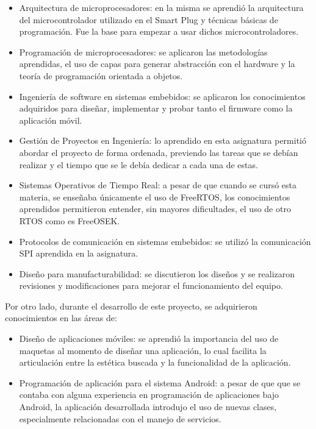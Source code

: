\begin{itemize}
\item Arquitectura de microprocesadores: en la misma se aprendió la arquitectura del microcontrolador utilizado en el Smart Plug y técnicas básicas de programación. Fue la base para empezar a usar dichos microcontroladores.
\item Programación de microprocesadores: se aplicaron las metodologías aprendidas, el uso de capas para generar abstracción con el hardware y la teoría de programación orientada a objetos.
\item Ingeniería de software en sistemas embebidos: se aplicaron los conocimientos adquiridos para diseñar, implementar y probar tanto el firmware como la aplicación móvil.
\item Gestión de Proyectos en Ingeniería: lo aprendido en esta asignatura permitió abordar el proyecto de forma ordenada, previendo las tareas  que se debían realizar y el tiempo que se le debía dedicar a cada una de estas.
\item Sistemas Operativos de Tiempo Real: a pesar de que cuando se cursó esta materia, se enseñaba únicamente el uso de FreeRTOS, los conocimientos aprendidos permitieron entender, sin mayores dificultades, el uso de otro RTOS como es FreeOSEK.
\item Protocolos de comunicación en sistemas embebidos: se utilizó la comunicación SPI aprendida en la asignatura.
\item Diseño para manufacturabilidad: se discutieron los diseños y se realizaron revisiones y modificaciones para mejorar el funcionamiento del equipo.
\end{itemize}


Por otro lado, durante el desarrollo de este proyecto, se adquirieron conocimientos en las áreas de:

\begin{itemize}
\item Diseño de aplicaciones móviles: se aprendió la importancia del uso de maquetas al momento de diseñar una aplicación, lo cual facilita la articulación entre la estética buscada y la funcionalidad de la aplicación.
\item Programación de aplicación para el sistema Android: a pesar de que que se contaba con alguna experiencia en programación de aplicaciones bajo Android, la aplicación desarrollada introdujo el uso de nuevas clases, especialmente relacionadas con el manejo de servicios.
\end{itemize}


